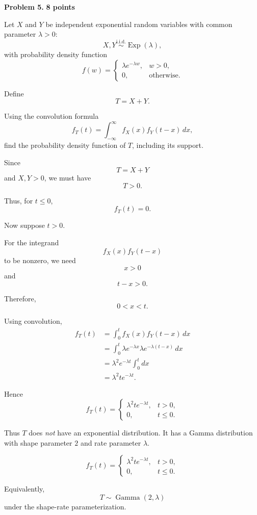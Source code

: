 \documentclass[11pt]{article}
\begin{document}
\newpage


\begin{problemheader}
\textbf{Problem 5.} \hfill \textbf{8 points}
\end{problemheader}

Let \(X\) and \(Y\) be independent exponential random variables with common
parameter \(\lambda>0\):
\[
X,Y\overset{\mathrm{i.i.d.}}{\sim}\operatorname{Exp}(\lambda),
\]
with probability density function
\[
f(w)=
\begin{cases}
\lambda e^{-\lambda w}, & w>0,\\
0, & \text{otherwise}.
\end{cases}
\]

Define
\[
T=X+Y.
\]

Using the convolution formula
\[
f_T(t)
=
\int_{-\infty}^{\infty}
f_X(x)f_Y(t-x)\,dx,
\]
find the probability density function of \(T\), including its support.

\begin{solutionbox}

Since
\[
T=X+Y
\]
and \(X,Y>0\), we must have
\[
T>0.
\]

Thus, for \(t\leq0\),
\[
f_T(t)=0.
\]

Now suppose \(t>0\).

For the integrand
\[
f_X(x)f_Y(t-x)
\]
to be nonzero, we need
\[
x>0
\]
and
\[
t-x>0.
\]

Therefore,
\[
0<x<t.
\]

Using convolution,
\begin{align*}
f_T(t)
&=
\int_0^t
f_X(x)f_Y(t-x)\,dx\\
&=
\int_0^t
\lambda e^{-\lambda x}
\lambda e^{-\lambda(t-x)}
\,dx\\
&=
\lambda^2e^{-\lambda t}
\int_0^t dx\\
&=
\lambda^2t e^{-\lambda t}.
\end{align*}

Hence
\[
f_T(t)
=
\begin{cases}
\lambda^2t e^{-\lambda t},
& t>0,\\
0,
& t\leq0.
\end{cases}
\]

Thus \(T\) does \emph{not} have an exponential distribution. It has a
Gamma distribution with shape parameter \(2\) and rate parameter
\(\lambda\).

\begin{finalanswerbox}

\[
f_T(t)
=
\begin{cases}
\lambda^2t e^{-\lambda t},
& t>0,\\
0,
& t\leq0.
\end{cases}
\]

Equivalently,
\[
T\sim\operatorname{Gamma}(2,\lambda)
\]
under the shape-rate parameterization.

\end{finalanswerbox}

\end{solutionbox}
\end{document}
